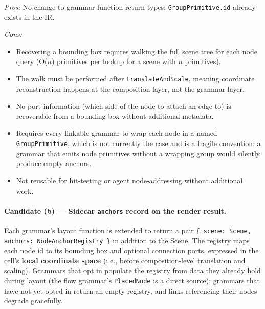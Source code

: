 \medskip
\textit{Pros:} No change to grammar function return types; \texttt{GroupPrimitive.id}
already exists in the IR.

\medskip
\textit{Cons:}
\begin{itemize}
  \item Recovering a bounding box requires walking the full scene tree for each
        node query (O($n$) primitives per lookup for a scene with $n$ primitives).
  \item The walk must be performed after \texttt{translateAndScale}, meaning
        coordinate reconstruction happens at the composition layer, not the
        grammar layer.
  \item No port information (which side of the node to attach an edge to) is
        recoverable from a bounding box without additional metadata.
  \item Requires every linkable grammar to wrap each node in a named
        \texttt{GroupPrimitive}, which is not currently the case and is a
        fragile convention: a grammar that emits node primitives without a
        wrapping group would silently produce empty anchors.
  \item Not reusable for hit-testing or agent node-addressing without
        additional work.
\end{itemize}

\paragraph{Candidate (b) — Sidecar \texttt{anchors} record on the render
result.}

Each grammar's layout function is extended to return a pair
\texttt{\{ scene: Scene, anchors: NodeAnchorRegistry \}} in addition to the
Scene.  The registry maps each node id to its bounding box and optional
connection ports, expressed in the cell's \textbf{local coordinate space}
(i.e., before composition-level translation and scaling).  Grammars that opt
in populate the registry from data they already hold during layout (the flow
grammar's \texttt{PlacedNode} is a direct source); grammars that have not yet
opted in return an empty registry, and links referencing their nodes degrade
gracefully.

